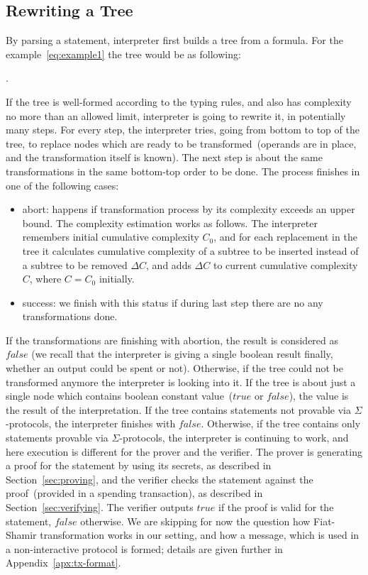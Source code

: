 \documentclass[11pt]{article}
\newcommand{\authnote}[2]{\marginpar{\parbox{\marginparwidth}{\tiny %
  \textsf{#1 {\textcolor{blue}{notes: #2}}}}}%
  \textcolor{blue}{\textbf{\dag}}}
\newcommand{\authnote}[2]{
  \textsf{#1 \textcolor{blue}{: #2}}}
\newcommand{\authnote}[2]{}
\newcommand{\knote}[1]{{\authnote{\textcolor{green}{kushti notes}}{#1}}}
\begin{document}
\subsection{Rewriting a Tree}
\label{sec:rewriting}

By parsing a statement, interpreter first builds a tree from a formula. For the example~\ref{eq:example1} the tree would be as following:

\knote{draw the tree}.

If the tree is well-formed according to the typing rules, and also has complexity no more than an allowed limit, interpreter is going to rewrite it, in potentially many steps. For every step, the interpreter tries, going from bottom to top of the tree, to replace nodes which are ready to be transformed~(operands are in place, and the transformation itself is known). The next step is about the same transformations in the same bottom-top order to be done. The process finishes in one of the following cases:

\begin{itemize}
    \item{abort: } happens if transformation process by its complexity exceeds an upper bound. The complexity estimation works as follows. The interpreter remembers initial cumulative complexity $C_0$, and for each replacement in the tree it calculates cumulative complexity of a subtree to be inserted instead of a subtree to be removed $\Delta C$, and adds $\Delta C$ to current cumulative complexity $C$, where $C = C_0$ initially.  
    \item{success: } we finish with this status if during last step there are no any transformations done.  
\end{itemize} 

If the transformations are finishing with abortion, the result is considered as $false$ (we recall that the interpreter is giving a single boolean result finally, whether an output could be spent or not). Otherwise, if the tree could not be transformed anymore the interpreter is looking into it. If the tree is about just a single node which contains boolean constant value~($true$ or $false$), the value is the result of the interpretation. If the tree contains statements not provable via $\Sigma$-protocols, the interpreter finishes with $false$. Otherwise, if the tree contains only statements provable via $\Sigma$-protocols, the interpreter is continuing to work, and here execution is different for the prover and the verifier. The prover is generating a proof for the statement by using its secrets, as described in Section~\ref{sec:proving}, and the verifier checks the statement against the proof~(provided in a spending transaction), as described in Section~\ref{sec:verifying}. The verifier outputs $true$ if the proof is valid for the statement, $false$ otherwise. We are skipping for now the question how Fiat-Shamir transformation works in our setting, and how a message, which is used in a non-interactive protocol is formed; details are given further in Appendix~\ref{apx:tx-format}. 
\end{document}
